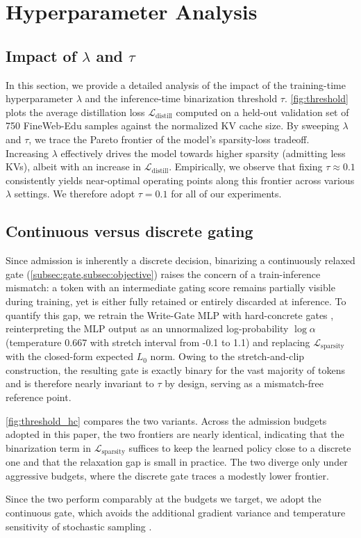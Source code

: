 \section{Hyperparameter Analysis}
\label{app:hyperparam}

\subsection{Impact of \texorpdfstring{$\lambda$}{λ} and \texorpdfstring{$\tau$}{τ}}

In this section, we provide a detailed analysis of the impact of the training-time hyperparameter $\lambda$ and the inference-time binarization threshold $\tau$. \cref{fig:threshold} plots the average distillation loss $\mathcal{L}_{\text{distill}}$ computed on a held-out validation set of 750 FineWeb-Edu samples against the normalized KV cache size. By sweeping $\lambda$ and $\tau$, we trace the Pareto frontier of the model's sparsity-loss tradeoff. Increasing $\lambda$ effectively drives the model towards higher sparsity (admitting less KVs), albeit with an increase in $\mathcal{L}_{\text{distill}}$. Empirically, we observe that fixing $\tau \approx 0.1$ consistently yields near-optimal operating points along this frontier across various $\lambda$ settings. We therefore adopt $\tau=0.1$ for all of our experiments.

\subsection{Continuous versus discrete gating}

Since admission is inherently a discrete decision, binarizing a continuously relaxed gate (\cref{subsec:gate,subsec:objective}) raises the concern of a train-inference mismatch: a token with an intermediate gating score remains partially visible during training, yet is either fully retained or entirely discarded at inference. To quantify this gap, we retrain the Write-Gate MLP with hard-concrete gates \cite{hardconcrete}, reinterpreting the MLP output as an unnormalized log-probability $\log \alpha$ (temperature 0.667 with stretch interval from -0.1 to 1.1) and replacing $\mathcal{L}_{\text{sparsity}}$ with the closed-form expected $L_0$ norm. Owing to the stretch-and-clip construction, the resulting gate is exactly binary for the vast majority of tokens and is therefore nearly invariant to $\tau$ by design, serving as a mismatch-free reference point.



\cref{fig:threshold_hc} compares the two variants. Across the admission budgets adopted in this paper, the two frontiers are nearly identical, indicating that the binarization term in $\mathcal{L}_{\text{sparsity}}$ suffices to keep the learned policy close to a discrete one and that the relaxation gap is small in practice. The two diverge only under aggressive budgets, where the discrete gate traces a modestly lower frontier.

Since the two perform comparably at the budgets we target, we adopt the continuous gate, which avoids the additional gradient variance and temperature sensitivity of stochastic sampling \cite{concrete,gumbel}.
